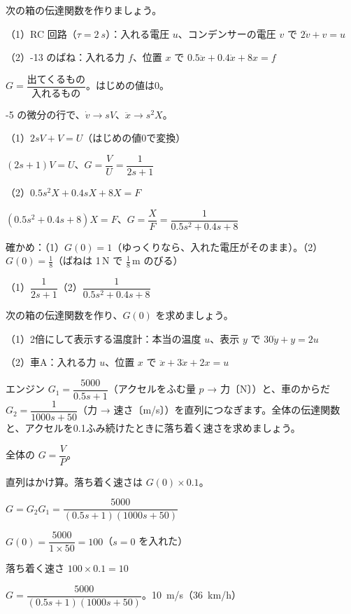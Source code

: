 \begin{reidai}[微分方程式から伝達関数を作る]
次の箱の伝達関数を作りましょう。\par
（1）\nobreak RC 回路（$\tau=\qty{2}{s}$）：入れる電圧 $u$、コンデンサーの電圧 $v$ で $2\dot v+v=u$\par
（2）-13 のばね：入れる力 $f$、位置 $x$ で $0.5\ddot x+0.4\dot x+8x=f$\par
\kangaekata {}\par
{}\enspace $G=\dfrac{\text{出てくるもの}}{\text{入れるもの}}$。はじめの値は0。\par
{}-5 の微分の行で、$\dot v\to sV$、$\ddot x\to s^2X$。\par
\shiki\kixis{}\zw{} （1）$2sV+V=U$\quad （はじめの値0で変換）\par
\kixib $(2s+1)V=U$、\quad $G=\dfrac{V}{U}=\dfrac{1}{2s+1}$\par
\kixia （2）$0.5s^2X+0.4sX+8X=F$\par
\kixib $(0.5s^2+0.4s+8)X=F$、\quad $G=\dfrac{X}{F}=\dfrac{1}{0.5s^2+0.4s+8}$\par
\kixia 確かめ：（1）$G(0)=1$（ゆっくりなら、入れた電圧がそのまま）。（2）$G(0)=\frac18$（ばねは 1\,N で $\frac18$\,m のびる）\par
\kotae （1）\nobreak $\dfrac{1}{2s+1}$\quad（2）\nobreak $\dfrac{1}{0.5s^2+0.4s+8}$
\end{reidai}

\begin{jibun}
次の箱の伝達関数を作り、$G(0)$ を求めましょう。\par
（1）\nobreak 2倍にして表示する温度計：本当の温度 $u$、表示 $y$ で $30\dot y+y=2u$\par
（2）\nobreak 車A：入れる力 $u$、位置 $x$ で $\ddot x+3\dot x+2x=u$
\end{jibun}

\begin{reidai}[エンジンと車をつなぐ]
エンジン $G_1=\dfrac{5000}{0.5s+1}$（アクセルをふむ量 $p$ → 力〔N〕）と、車のからだ $G_2=\dfrac{1}{1000s+50}$（力 → 速さ〔m/s〕）を直列につなぎます。全体の伝達関数と、アクセルを0.1ふみ続けたときに落ち着く速さを求めましょう。\par
\kangaekata {}\par
{}\enspace 全体の $G=\dfrac{V}{P}$。\par
{}\enspace 直列はかけ算。落ち着く速さは $G(0)\times0.1$。\par
\shiki\kixis{}\zw{} $G=G_2G_1=\dfrac{5000}{(0.5s+1)(1000s+50)}$\par
\kixia $G(0)=\dfrac{5000}{1\times50}=100$\quad （$s=0$ を入れた）\par
\kixia 落ち着く速さ $100\times0.1=10$\par
\kotae $G=\dfrac{5000}{(0.5s+1)(1000s+50)}$。\qty{10}{m/s}（\qty{36}{km/h}）
\end{reidai}

